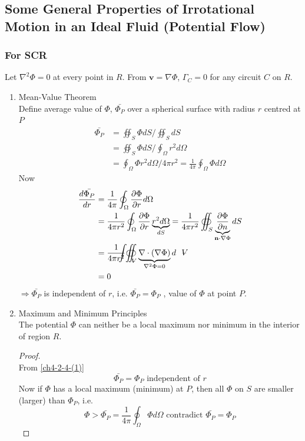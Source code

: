 \subsection{Some General Properties of Irrotational Motion in an Ideal Fluid (Potential Flow)}
\subsubsection{For SCR}
Let $\nabla^2\Phi = 0$ at every point in $R$. From $\mathbf{v} = \nabla\Phi$,
$\Gamma_C = 0$ for any circuit $C$ on $R$.
\begin{enumerate}[label = (\arabic*)]
\item\label{ch4-2-4-(1)} Mean-Value Theorem\\
Define average value of $\Phi$, $\bar{\Phi_P}$ over a spherical surface with radius $r$ centred at $P$
\begin{align}
\bar{\Phi_P}
&= \oiint_S\Phi dS/\oiint_SdS\tag{$\ast$} \\
&= \oiint_S\Phi dS/\oint_\Omega r^2d\Omega\nonumber \\
&= \oint_\Omega\Phi r^2d\Omega /4\pi r^2 = \frac{1}{4\pi}\oint_\Omega\Phi d\Omega\tag{$\ast\ast$}
\end{align}
Now
\begin{align*}
\frac{d\bar{\Phi_P}}{dr}
&= \frac{1}{4\pi}\oint_\Omega\frac{\partial\Phi}{\partial r}d\Omega \\
&= \frac{1}{4\pi r^2}\oint_\Omega\frac{\partial\Phi}{\partial r}\underbrace{r^2d\Omega}_{dS} = \frac{1}{4\pi r^2}\oiint_S\underbrace{\frac{\partial\Phi}{\partial n}}_{\mathbf{n}\cdot\nabla\Phi}dS \\
&= \frac{1}{4\pi r^2}{\oiint \hspace{-23.5pt} \int}_{\volume}\underbrace{\nabla\cdot\left(\nabla\Phi\right)}_{\nabla^2\Phi = 0}d\volume \\
&=0
\end{align*}
$\Longrightarrow\bar{\Phi_P}$ is independent of $r$, i.e. $\bar{\Phi_P} = \Phi_P$ , value of $\Phi$ at point $P$.
\item Maximum and Minimum Principles\\
The potential $\Phi$ can neither be a local maximum nor minimum in the interior of region $R$.
\begin{proof}\mbox{}\\
From \ref{ch4-2-4-(1)}
\[
\bar{\Phi_P} = \Phi_P\text{ independent of }r
\]
Now if $\Phi$ has a local maximum (minimum) at $P$, then all $\Phi$ on $S$ are smaller (larger) than $\Phi_P$, i.e.
\[
\Phi >\bar{\Phi_P} = \frac{1}{4\pi}\oint_\Omega\Phi d\Omega\text{ contradict }\bar{\Phi_P} = \Phi_P
\]
\end{proof}
\end{enumerate}
